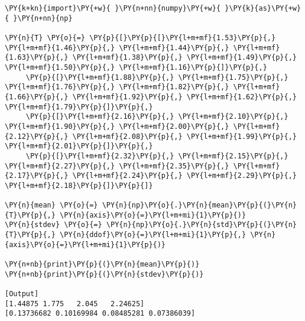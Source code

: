 \begin{Verbatim}[label=\makebox{\href{https://github.com/unipi-physics-labs/statnotes/tree/main/snippy/sample_stat_numpy_vec.py}{https://github.com/.../sample\_stat\_numpy\_vec.py}},commandchars=\\\{\}]
\PY{k+kn}{import}\PY{+w}{ }\PY{n+nn}{numpy}\PY{+w}{ }\PY{k}{as}\PY{+w}{ }\PY{n+nn}{np}

\PY{n}{T} \PY{o}{=} \PY{p}{[}\PY{p}{[}\PY{l+m+mf}{1.53}\PY{p}{,} \PY{l+m+mf}{1.46}\PY{p}{,} \PY{l+m+mf}{1.44}\PY{p}{,} \PY{l+m+mf}{1.63}\PY{p}{,} \PY{l+m+mf}{1.38}\PY{p}{,} \PY{l+m+mf}{1.49}\PY{p}{,} \PY{l+m+mf}{1.50}\PY{p}{,} \PY{l+m+mf}{1.16}\PY{p}{]}\PY{p}{,}
     \PY{p}{[}\PY{l+m+mf}{1.88}\PY{p}{,} \PY{l+m+mf}{1.75}\PY{p}{,} \PY{l+m+mf}{1.76}\PY{p}{,} \PY{l+m+mf}{1.82}\PY{p}{,} \PY{l+m+mf}{1.66}\PY{p}{,} \PY{l+m+mf}{1.92}\PY{p}{,} \PY{l+m+mf}{1.62}\PY{p}{,} \PY{l+m+mf}{1.79}\PY{p}{]}\PY{p}{,}
     \PY{p}{[}\PY{l+m+mf}{2.16}\PY{p}{,} \PY{l+m+mf}{2.10}\PY{p}{,} \PY{l+m+mf}{1.90}\PY{p}{,} \PY{l+m+mf}{2.00}\PY{p}{,} \PY{l+m+mf}{2.12}\PY{p}{,} \PY{l+m+mf}{2.08}\PY{p}{,} \PY{l+m+mf}{1.99}\PY{p}{,} \PY{l+m+mf}{2.01}\PY{p}{]}\PY{p}{,}
     \PY{p}{[}\PY{l+m+mf}{2.32}\PY{p}{,} \PY{l+m+mf}{2.15}\PY{p}{,} \PY{l+m+mf}{2.27}\PY{p}{,} \PY{l+m+mf}{2.35}\PY{p}{,} \PY{l+m+mf}{2.17}\PY{p}{,} \PY{l+m+mf}{2.24}\PY{p}{,} \PY{l+m+mf}{2.29}\PY{p}{,} \PY{l+m+mf}{2.18}\PY{p}{]}\PY{p}{]}

\PY{n}{mean} \PY{o}{=} \PY{n}{np}\PY{o}{.}\PY{n}{mean}\PY{p}{(}\PY{n}{T}\PY{p}{,} \PY{n}{axis}\PY{o}{=}\PY{l+m+mi}{1}\PY{p}{)}
\PY{n}{stdev} \PY{o}{=} \PY{n}{np}\PY{o}{.}\PY{n}{std}\PY{p}{(}\PY{n}{T}\PY{p}{,} \PY{n}{ddof}\PY{o}{=}\PY{l+m+mi}{1}\PY{p}{,} \PY{n}{axis}\PY{o}{=}\PY{l+m+mi}{1}\PY{p}{)}

\PY{n+nb}{print}\PY{p}{(}\PY{n}{mean}\PY{p}{)}
\PY{n+nb}{print}\PY{p}{(}\PY{n}{stdev}\PY{p}{)}

[Output]
[1.44875 1.775   2.045   2.24625]
[0.13736682 0.10169984 0.08485281 0.07386039]
\end{Verbatim}

